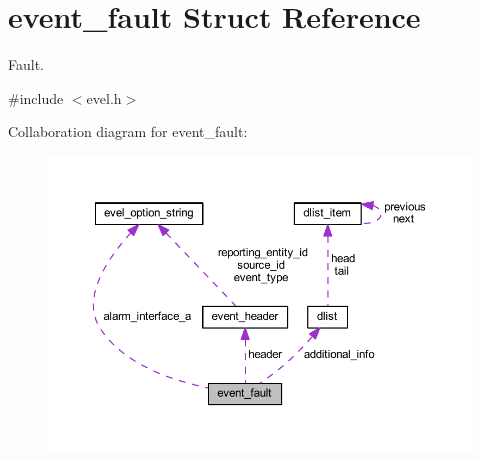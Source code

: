\hypertarget{structevent__fault}{}\section{event\+\_\+fault Struct Reference}
\label{structevent__fault}


Fault.  




{\ttfamily \#include $<$evel.\+h$>$}



Collaboration diagram for event\+\_\+fault\+:
\nopagebreak
\begin{figure}[H]
\begin{center}
\leavevmode
\includegraphics[width=350pt]{structevent__fault__coll__graph}
\end{center}
\end{figure}
